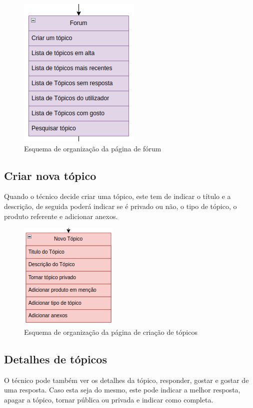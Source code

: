 \begin{figure}[htb]
  \centering
  
  \includegraphics[height=0.4\textwidth]{images/Arquiteturas/superficial_de_app/forum.png}
  \caption{Esquema de organização da página de fórum}
  \label{fig:5}
\end{figure}

\subsection{Criar nova tópico}

Quando o técnico decide criar uma tópico, este tem de indicar o título e a descrição, de seguida poderá indicar se é privado ou não, o tipo de tópico, o produto referente e adicionar anexos.

\begin{figure}[htb]
  \centering
  
  \includegraphics[height=0.3\textwidth]{images/Arquiteturas/superficial_de_app/criar_topico.png}
  \caption{Esquema de organização da página de criação de tópicos}
  \label{fig:6}
\end{figure}

\newpage

\subsection{Detalhes de tópicos}

O técnico pode também ver os detalhes da tópico, responder, 
gostar e gostar de uma resposta.
Caso esta seja do mesmo, este pode indicar a melhor resposta, apagar a tópico, tornar pública ou privada e indicar como completa.


